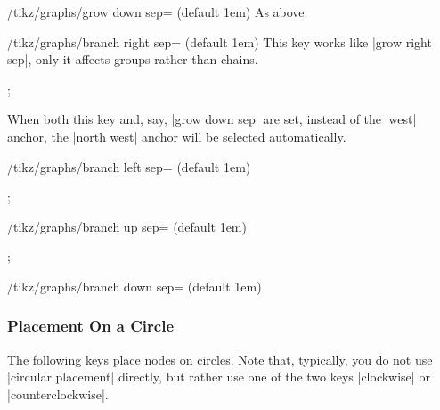 \begin{key}{/tikz/graphs/grow down sep= (default 1em)}
    As above.
\end{key}

\begin{key}{/tikz/graphs/branch right sep= (default 1em)}
    This key works like |grow right sep|, only it affects groups rather than
    chains.
\begin{codeexample}[preamble={\usetikzlibrary{graphs}}]
\tikz {};
\end{codeexample}
    When both this key and, say, |grow down sep| are set, instead of the |west|
    anchor, the |north west| anchor will be selected automatically.
\end{key}

\begin{key}{/tikz/graphs/branch left sep= (default 1em)}
%
\begin{codeexample}[preamble={\usetikzlibrary{graphs}}]
\tikz {};
\end{codeexample}
%
\end{key}

\begin{key}{/tikz/graphs/branch up sep= (default 1em)}
%
\begin{codeexample}[preamble={\usetikzlibrary{graphs}}]
\tikz {};
\end{codeexample}
%
\end{key}

\begin{key}{/tikz/graphs/branch down sep= (default 1em)}
\end{key}


\subsubsection{Placement On a Circle}

The following keys place nodes on circles. Note that, typically, you do not use
|circular placement| directly, but rather use one of the two keys |clockwise|
or |counterclockwise|.

